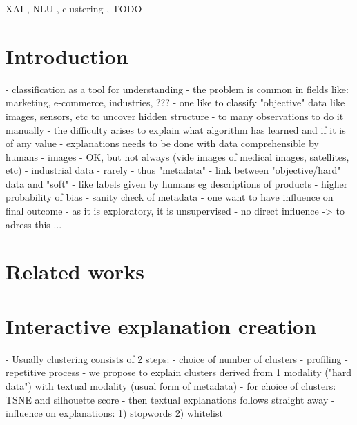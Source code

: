 \documentclass[
]{ceurart}
\begin{document}
\begin{keywords}
  XAI \sep
  NLU \sep
  clustering \sep
  TODO
\end{keywords}

\maketitle

\section{Introduction}
- classification as a tool for understanding
- the problem is common in fields like: marketing, e-commerce, industries, ???
- one like to classify "objective" data like images, sensors, etc to uncover hidden structure
   - to many observations to do it manually
- the difficulty arises to explain what algorithm has learned and if it is of any value
- explanations needs to be done with data comprehensible by humans
  - images - OK, but not always (vide images of medical images, satellites,  etc)
  - industrial data - rarely
  - thus "metadata" - link between "objective/hard" data and "soft" - like labels given by humans eg descriptions of products
  - higher probability of bias
  - sanity check of metadata
- one want to have influence on final outcome
  - as it is exploratory, it is unsupervised
  - no direct influence -> to adress this ...

\section{Related works}

\section{Interactive explanation creation}
- Usually clustering consists of 2 steps:
  - choice of number of clusters
  - profiling
  - repetitive process
- we propose to explain clusters derived from 1 modality ("hard data") with textual modality (usual form of metadata)
  - for choice of clusters: TSNE and silhouette score
  - then textual explanations follows straight away
  - influence on explanations: 1) stopwords 2) whitelist
\end{document}

